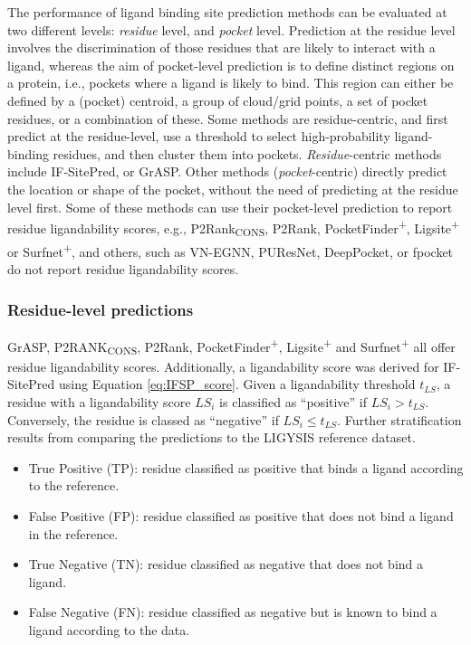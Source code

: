 The performance of ligand binding site prediction methods can be evaluated at two different levels: \textit{residue} level, and \textit{pocket} level. Prediction at the residue level involves the discrimination of those residues that are likely to interact with a ligand, whereas the aim of pocket-level prediction is to define distinct regions on a protein, i.e., pockets where a ligand is likely to bind. This region can either be defined by a (pocket) centroid, a group of cloud/grid points, a set of pocket residues, or a combination of these. Some methods are residue-centric, and first predict at the residue-level, use a threshold to select high-probability ligand-binding residues, and then cluster them into pockets. \textit{Residue}-centric methods include IF-SitePred, or GrASP. Other methods (\textit{pocket}-centric) directly predict the location or shape of the pocket, without the need of predicting at the residue level first. Some of these methods can use their pocket-level prediction to report residue ligandability scores, e.g., P2Rank\textsubscript{CONS}, P2Rank, PocketFinder\textsuperscript{+}, Ligsite\textsuperscript{+} or Surfnet\textsuperscript{+}, and others, such as VN-EGNN, PUResNet, DeepPocket, or fpocket do not report residue ligandability scores.

\subsubsection{Residue-level predictions}

GrASP, P2RANK\textsubscript{CONS}, P2Rank, PocketFinder\textsuperscript{+}, Ligsite\textsuperscript{+} and Surfnet\textsuperscript{+} all offer residue ligandability scores. Additionally, a ligandability score was derived for IF-SitePred using Equation \ref{eq:IFSP_score}. Given a ligandability threshold $t_{LS}$, a residue with a ligandability score $LS_{i}$ is classified as ``positive'' if $LS_{i} > t_{LS}$. Conversely, the residue is classed as ``negative'' if $LS_{i} \leq t_{LS}$. Further stratification results from comparing the predictions to the LIGYSIS reference dataset.

\begin{itemize}
\item True Positive (TP): residue classified as positive that binds a ligand according to the reference.
\item False Positive (FP): residue classified as positive that does not bind a ligand in the reference.
\item True Negative (TN): residue classified as negative that does not bind a ligand.
\item False Negative (FN): residue classified as negative but is known to bind a ligand according to the data.
\end{itemize}

